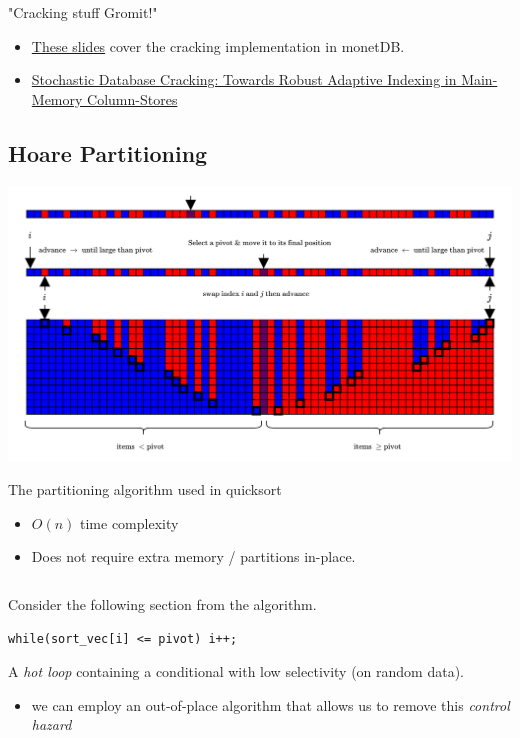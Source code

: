 \begin{sidenotebox}{"Cracking stuff Gromit!"}
    \begin{itemize}
        \item \href{https://homepages.cwi.nl/~mk/onderwijs/adt2009/lectures/lecture5.pdf}{These slides} cover the cracking implementation in monetDB.
        \item \href{https://stratos.seas.harvard.edu/sites/scholar.harvard.edu/files/StochasticDatabaseCrackingPVLDB12.pdf}{Stochastic Database Cracking: Towards Robust Adaptive
                  Indexing in Main-Memory Column-Stores}
    \end{itemize}
\end{sidenotebox}

\subsection{Hoare Partitioning}
\begin{center}
    \includegraphics[width=\textwidth]{advanced_topics/images/hoare_partitioning.drawio.png}
\end{center}
The partitioning algorithm used in quicksort
\begin{itemize}
    \item $O(n)$ time complexity
    \item Does not require extra memory / partitions in-place.
\end{itemize}
\inputminted[firstline=5]{cpp}{advanced_topics/code/partition_comparison/partitions/in_place_conditional.h}

Consider the following section from the algorithm.
\begin{verbatim}
while(sort_vec[i] <= pivot) i++;
\end{verbatim}
A \textit{hot loop} containing a conditional with low selectivity (on random data).
\begin{itemize}
    \item we can employ an out-of-place algorithm that allows us to remove this \textit{control hazard}
\end{itemize}

